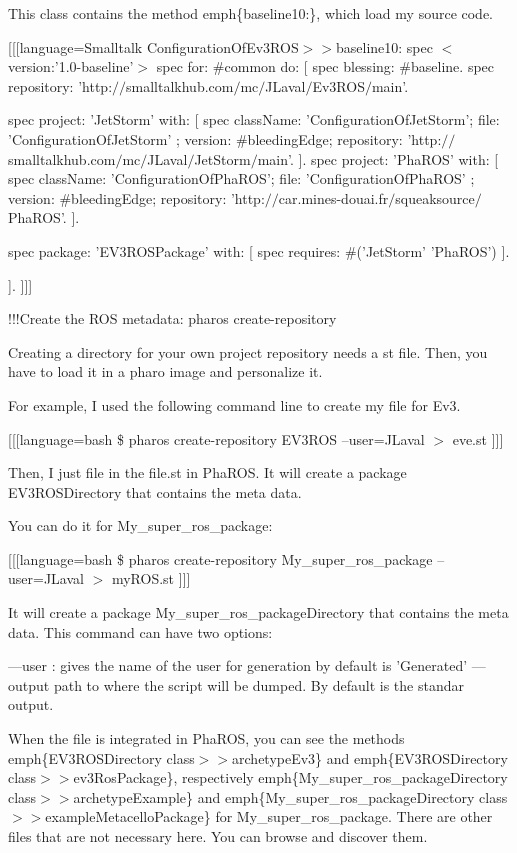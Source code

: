\documentclass[a4paper,10pt,twoside]{book}
\begin{document}
This class contains the method emph\{baseline10:\}, which load my source code.

{[}{[}{[}language=Smalltalk
ConfigurationOfEv3ROS$>$$>$baseline10: spec
  $<$version:'1.0-baseline'$>$
  spec for: \#common do: {[}
      spec blessing: \#baseline.
      spec repository: 'http:$/$$/$smalltalkhub.com$/$mc$/$JLaval$/$Ev3ROS$/$main'.

      spec project: 'JetStorm' with: {[}
        spec
          className: 'ConfigurationOfJetStorm';
          file: 'ConfigurationOfJetStorm' ;
          version: \#bleedingEdge;
          repository: 'http:$/$$/$smalltalkhub.com$/$mc$/$JLaval$/$JetStorm$/$main'.
      {]}.
      spec project: 'PhaROS' with: {[}
        spec
          className: 'ConfigurationOfPhaROS';
          file: 'ConfigurationOfPhaROS' ;
          version: \#bleedingEdge;
          repository: 'http:$/$$/$car.mines-douai.fr$/$squeaksource$/$PhaROS'.
      {]}.

      spec package: 'EV3ROSPackage' with: {[}
        spec requires: \#('JetStorm' 'PhaROS')
      {]}.

  {]}.
{]}{]}{]}

!!!Create the ROS metadata: pharos create-repository

Creating a directory for your own project repository needs a st file. Then, you have to load it in a pharo image and personalize it.

For example, I used the following command line to create my file for Ev3.

{[}{[}{[}language=bash
\$ pharos create-repository EV3ROS --user=JLaval $>$ eve.st
{]}{]}{]}

Then, I just file in the file.st in PhaROS. It will create a package EV3ROSDirectory that contains the meta data.

You can do it for My\_super\_ros\_package:

{[}{[}{[}language=bash
\$ pharos create-repository My\_super\_ros\_package --user=JLaval $>$ myROS.st
{]}{]}{]}

It will create a package My\_super\_ros\_packageDirectory that contains the meta data.
This command can have two options:


  ---user : gives the name of the user for generation by default is 'Generated'
  ---output path to where the script will be dumped. By default is the standar output.


When the file is integrated in PhaROS, you can see the methods emph\{EV3ROSDirectory class$>$$>$archetypeEv3\} and emph\{EV3ROSDirectory class$>$$>$ev3RosPackage\}, respectively emph\{My\_super\_ros\_packageDirectory class$>$$>$archetypeExample\} and emph\{My\_super\_ros\_packageDirectory class$>$$>$exampleMetacelloPackage\} for My\_super\_ros\_package. There are other files that are not necessary here. You can browse and discover them.
\end{document}

